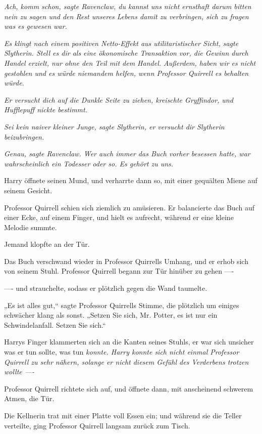 {\emph{Ach, komm schon, sagte Ravenclaw, du kannst uns nicht ernsthaft darum bitten nein zu sagen und den Rest unseres Lebens damit zu verbringen, sich zu fragen was es gewesen war.}

\emph{Es klingt nach einem positiven Netto-Effekt aus utilitaristischer Sicht, sagte Slytherin. Stell es dir als eine ökonomische Transaktion vor, die Gewinn durch Handel erzielt, nur ohne den Teil mit dem Handel. Außerdem, haben wir es nicht gestohlen und es würde niemandem helfen, wenn Professor Quirrell es behalten würde.}

\emph{Er versucht dich auf die Dunkle Seite zu ziehen, kreischte Gryffindor, und Hufflepuff nickte bestimmt.}

\emph{Sei kein naiver kleiner Junge, sagte Slytherin, er versucht dir Slytherin beizubringen.}

\emph{Genau, sagte Ravenclaw. Wer auch immer das Buch vorher besessen hatte, war wahrscheinlich ein Todesser oder so. Es gehört zu uns.}

Harry öffnete seinen Mund, und verharrte dann so, mit einer gequälten Miene auf seinem Gesicht.

Professor Quirrell schien sich ziemlich zu amüsieren. Er balancierte das Buch auf einer Ecke, auf einem Finger, und hielt es aufrecht, während er eine kleine Melodie summte.

Jemand klopfte an der Tür.

Das Buch verschwand wieder in Professor Quirrells Umhang, und er erhob sich von seinem Stuhl. Professor Quirrell begann zur Tür hinüber zu gehen ----

---- und strauchelte, sodass er plötzlich gegen die Wand taumelte.

„Es ist alles gut,“ sagte Professor Quirrells Stimme, die plötzlich um einiges schwächer klang als sonst. „Setzen Sie sich, Mr. Potter, es ist nur ein Schwindelanfall. Setzen Sie sich.“

Harrys Finger klammerten sich an die Kanten seines Stuhls, er war sich unsicher was er tun sollte, was tun \emph{konnte. Harry konnte sich nicht einmal Professor Quirrell zu sehr nähern, solange er nicht diesem Gefühl des Verderbens trotzen wollte ----}

Professor Quirrell richtete sich auf, und öffnete dann, mit anscheinend schwerem Atmen, die Tür.

Die Kellnerin trat mit einer Platte voll Essen ein; und während sie die Teller verteilte, ging Professor Quirrell langsam zurück zum Tisch.

}
